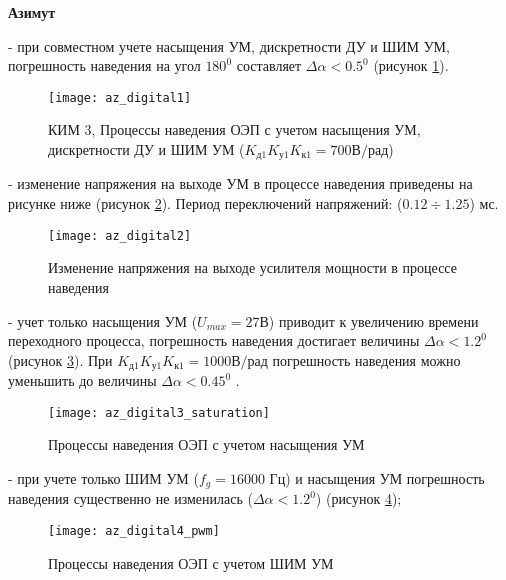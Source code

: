 \textbf{Азимут}

- при совместном учете насыщения УМ, дискретности ДУ и ШИМ УМ, погрешность наведения на угол $180^0$  составляет $ \varDelta\alpha < 0.5^0$ (рисунок \ref{fig:az_digital}).\par

\begin{figure}
	\centering
	\texttt{[image: az\_digital1]} 
	\caption{КИМ 3, Процессы наведения ОЭП с учетом насыщения УМ, дискретности ДУ и ШИМ УМ ($K_{\textit{д1}} K_{\textit{у1}} K_{\textit{к1}} = 700 \textit{В/рад}$)}
	\label{fig:az_digital}
\end{figure}

- изменение напряжения на выходе УМ в процессе наведения приведены на рисунке ниже (рисунок \ref{fig:az_digital2}). Период переключений напряжений: ($0.12   \div   1.25$) мс.\par

\begin{figure}
	\centering
	\texttt{[image: az\_digital2]} 
	\caption{Изменение напряжения на выходе усилителя мощности в процессе наведения}
	\label{fig:az_digital2}
\end{figure}

- учет только насыщения УМ ($U_{max}=27\textit{В}$)  приводит к увеличению времени переходного процесса, погрешность наведения достигает величины  $ \varDelta\alpha < 1.2^0$  (рисунок \ref{fig:az_digital3}). При   $K_{\textit{д1}} K_{\textit{у1}} K_{\textit{к1}} = 1000 \textit{В/рад}$  погрешность наведения можно уменьшить до величины $\varDelta\alpha < 0.45^0$ . \par

\begin{figure}
	\centering
	\texttt{[image: az\_digital3\_saturation]} 
	\caption{Процессы наведения ОЭП с учетом насыщения УМ}
	\label{fig:az_digital3}
\end{figure}

- при учете только ШИМ УМ ($f_g = 16000$ Гц) и насыщения УМ погрешность наведения существенно не изменилась ($\varDelta\alpha < 1.2^0$) (рисунок \ref{fig:az_digital4});\par

\begin{figure}
	\centering
	\texttt{[image: az\_digital4\_pwm]} 
	\caption{Процессы наведения ОЭП с учетом ШИМ УМ}
	\label{fig:az_digital4}
\end{figure}

